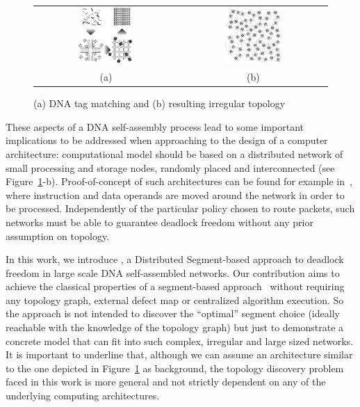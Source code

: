 \begin{figure}
\centering
\begin{tabular}{cc}
    \includegraphics[width=0.40\textwidth]{pictures/dna2b.eps} &
    \includegraphics[width=0.40\textwidth]{pictures/dna1_complex2.eps} \\
 (a) & (b)
 \end{tabular}
  \caption{(a) DNA tag matching and (b) resulting irregular topology}
  \label{fig:nana}
\end{figure}
These aspects of a DNA self-assembly process lead to some important
implications to be addressed when approaching to the design of
a computer architecture: computational model should be based on a
distributed network of small processing and storage nodes, randomly
placed and interconnected (see Figure~\ref{fig:nana}-b).
Proof-of-concept of such architectures can be found for
example in~\cite{patwardhan2006_1}, where instruction and data
operands are moved around the network in order to be processed.
Independently of the particular policy chosen to route packets,
such networks must be able to guarantee deadlock freedom without any
prior assumption on topology.

In this work, we introduce \disr{}, a Distributed Segment-based approach
to deadlock freedom in large scale DNA self-assembled networks. Our
contribution aims to achieve the classical properties of a
segment-based approach~\cite{mejia_ipdps06} without requiring any
topology graph, external defect map or centralized algorithm
execution.  So the \disr{} approach is not intended to discover the
``optimal'' segment choice (ideally reachable with the knowledge of
the topology graph) but just to demonstrate a concrete model that can
fit into such complex, irregular and large sized networks.
It is important to
underline that, although we can assume an architecture similar to the
one depicted in Figure~\ref{fig:nana} as background, the topology discovery
problem faced in this work is more general and not strictly dependent on any of the
underlying computing architectures.


